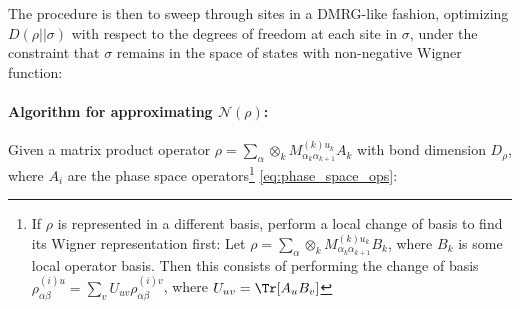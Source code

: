 \documentclass{article}
\begin{document}
The procedure is then to sweep through sites in a DMRG-like fashion, optimizing $D(\rho||\sigma)$ with respect to the degrees of freedom at each site in $\sigma$, under the constraint that $\sigma$ remains in the space of states with non-negative Wigner function:

\pagebreak 

\paragraph{Algorithm for approximating $\mathcal N(\rho)$:} Given a matrix product operator $\rho=\sum_\alpha \otimes_k M^{(k)u_k}_{\alpha_k\alpha_{k+1}} A_k$ with bond dimension $D_\rho$, where $A_i$ are the phase space operators\footnote{If $\rho$ is represented in a different basis, perform a local change of basis to find its Wigner representation first: Let $\rho=\sum_\alpha \otimes_k M^{(k)u_k}_{\alpha_k\alpha_{k+1}} B_k$, where $B_k$ is some local operator basis. Then this consists of performing the change of basis $\rho^{(i)u}_{\alpha\beta}=\sum_v U_{uv}\rho^{(i)v}_{\alpha\beta}$, where $U_{uv}=\Tr[A_uB_v]$} \eqref{eq:phase_space_ops}:
\end{document}
